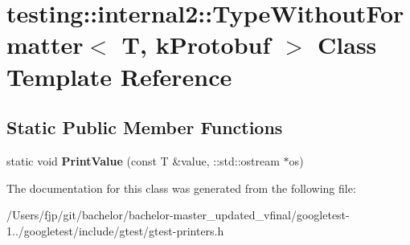 \hypertarget{classtesting_1_1internal2_1_1_type_without_formatter_3_01_t_00_01k_protobuf_01_4}{}\section{testing\+:\+:internal2\+:\+:Type\+Without\+Formatter$<$ T, k\+Protobuf $>$ Class Template Reference}
\label{classtesting_1_1internal2_1_1_type_without_formatter_3_01_t_00_01k_protobuf_01_4}
\subsection*{Static Public Member Functions}
\begin{DoxyCompactItemize}
\item 
\mbox{\label{classtesting_1_1internal2_1_1_type_without_formatter_3_01_t_00_01k_protobuf_01_4_ac96fb775dc776f02da9a671ea0e04599}} 
static void {\bfseries Print\+Value} (const T \&value, \+::std\+::ostream $\ast$os)
\end{DoxyCompactItemize}


The documentation for this class was generated from the following file\+:\begin{DoxyCompactItemize}
\item 
/\+Users/fjp/git/bachelor/bachelor-\/master\+\_\+updated\+\_\+vfinal/googletest-\/1../googletest/include/gtest/gtest-\/printers.\+h\end{DoxyCompactItemize}
